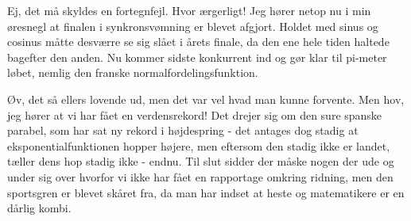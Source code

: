 \documentclass[a4paper,11pt]{article}
\begin{document}
\begin{sketch}

 Ej, det må skyldes en fortegnfejl. Hvor ærgerligt! Jeg hører netop nu i min øresnegl at finalen i synkronsvømning er blevet afgjort. Holdet med sinus og cosinus måtte desværre se sig slået i årets finale, da den ene hele tiden haltede bagefter den anden. Nu kommer sidste konkurrent ind og gør klar til pi-meter løbet, nemlig den franske normalfordelingsfunktion.


 Øv, det så ellers lovende ud, men det var vel hvad man kunne forvente. Men hov, jeg hører at vi har fået en verdensrekord! Det drejer sig om den sure spanske parabel, som har sat ny rekord i højdespring - det antages dog stadig at eksponentialfunktionen hopper højere, men eftersom den stadig ikke er landet, tæller dens hop stadig ikke - endnu. Til slut sidder der måske nogen der ude og under sig over hvorfor vi ikke har fået en rapportage omkring ridning, men den sportsgren er blevet skåret fra, da man har indset at heste og matematikere er en dårlig kombi.
\end{sketch}
\end{document}
